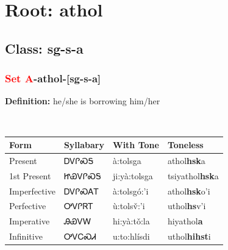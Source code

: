 \needspace{4in}
\section*{Root: athol}
\nopagebreak
{}
\needspace{3in}
\subsection*{Class: sg-s-a}
\nopagebreak
\needspace{2in}
\subsubsection*{\textcolor{Red}{Set A}{-}\textbf{athol}{-}[sg-s-a]}
\nopagebreak
\textbf{Definition: } he/she is borrowing him/her
\\[0.5em]
\begin{tabularx}{\textwidth}{l X X X}%
\toprule%
\textbf{Form}&\textbf{Syllabary}&\textbf{With Tone}&\textbf{Toneless}\\%
\midrule%
Present&ᎠᏙᎵᏍᎦ&à:tolsga&athol\textbf{hsk}a\\%
1st Present&ᏥᏯᏙᎵᏍᎦ&ji:yà:tolsga&tsiyathol\textbf{hsk}a\\%
Imperfective&ᎠᏙᎵᏍᎪᎢ&à:tolsgó:’i&athol\textbf{hsk}o'i\\%
Perfective&ᎤᏙᎵᏒᎢ&ù:tolsv̌:’i&uthol\textbf{hs}v'i\\%
Imperative&ᎯᏯᏙᎳ&hi:yà:tǒ:la&hiyathol\textbf{a}\\%
Infinitive&ᎤᏙᏟᏍᏗ&u:to:hlísdi&uthol\textbf{hihst}i\\%
\bottomrule%
\end{tabularx}
\\[1em]